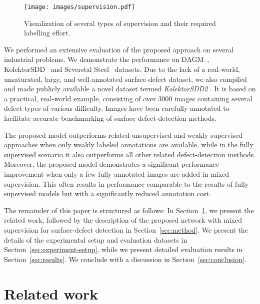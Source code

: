 \begin{figure}
    \centering
    \texttt{[image: images/supervision.pdf]}
    \caption{Visualization of several types of supervision and their required labelling effort.} 
    \label{fig:supervision-types}
\end{figure}

We performed an extensive evaluation of the proposed approach on several industrial problems. We demonstrate the performance on DAGM~\cite{Weimer2016}, KolektorSDD~\cite{Tabernik2019JIM} and Severstal Steel~\cite{SeverstalSteel2019} datasets. Due to the lack of a real-world, unsaturated, large, and well-annotated surface-defect dataset, we also compiled and made publicly available a novel dataset termed \textit{KolektorSDD2}%
. It is based on a practical, real-world example, consisting of over 3000 images containing several defect types of various difficulty. Images have been carefully annotated to facilitate accurate benchmarking of surface-defect-detection methods.
 

The proposed model outperforms related unsupervised and weakly supervised approaches when only weakly labeled annotations are available, while in the fully supervised scenario it also outperforms all other related defect-detection methods.
Moreover, the proposed model demonstrates a significant performance improvement when only a few fully annotated images are added in mixed supervision. This often results in performance comparable to the results of fully supervised models but with a significantly reduced annotation cost. 

The remainder of this paper is structured as follows: In Section~\ref{sec:related-work}, we present the related work, followed by the description of the proposed network with mixed supervision for surface-defect detection in Section~\ref{sec:method}.
We present the details of the experimental setup and evaluation datasets in Section~\ref{sec:experiment-setup}, while we present detailed evaluation results in Section~\ref{sec:results}. We conclude with a discussion in Section~\ref{sec:conclusion}.

\section{Related work} \label{sec:related-work}

